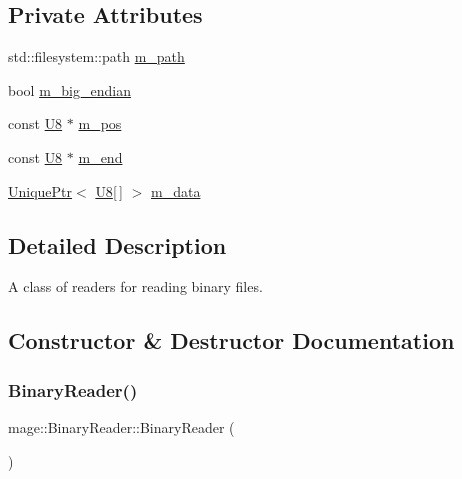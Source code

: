 \subsection*{Private Attributes}
\begin{DoxyCompactItemize}
\item 
std\+::filesystem\+::path \mbox{\hyperlink{classmage_1_1_binary_reader_a0941e624c8386fee2e2e92c6d1efdb75}{m\+\_\+path}}
\item 
bool \mbox{\hyperlink{classmage_1_1_binary_reader_a8d23fde958e08efe248edb5d92861113}{m\+\_\+big\+\_\+endian}}
\item 
const \mbox{\hyperlink{namespacemage_afc638980bc6154f15af5e2d93a0e0ea9}{U8}} $\ast$ \mbox{\hyperlink{classmage_1_1_binary_reader_aedb9632de1cf95d5af49499217744ed5}{m\+\_\+pos}}
\item 
const \mbox{\hyperlink{namespacemage_afc638980bc6154f15af5e2d93a0e0ea9}{U8}} $\ast$ \mbox{\hyperlink{classmage_1_1_binary_reader_a19b0f36cb1e8a05aaa9471514242e8ef}{m\+\_\+end}}
\item 
\mbox{\hyperlink{namespacemage_a3316d7143a973e37adf1110f2e80ca31}{Unique\+Ptr}}$<$ \mbox{\hyperlink{namespacemage_afc638980bc6154f15af5e2d93a0e0ea9}{U8}}\mbox{[}$\,$\mbox{]} $>$ \mbox{\hyperlink{classmage_1_1_binary_reader_a529bdcb620e1250aa0b12716c9b7eae1}{m\+\_\+data}}
\end{DoxyCompactItemize}


\subsection{Detailed Description}
A class of readers for reading binary files. 

\subsection{Constructor \& Destructor Documentation}
\mbox{\label{classmage_1_1_binary_reader_aab82579cef4f2f022273cf1adfcc8497}} 
\subsubsection{\texorpdfstring{Binary\+Reader()}{BinaryReader()}\hspace{0.1cm}{\footnotesize\ttfamily [1/3]}}
{\footnotesize\ttfamily mage\+::\+Binary\+Reader\+::\+Binary\+Reader (\begin{DoxyParamCaption}{ }\end{DoxyParamCaption})\hspace{0.3cm}{\ttfamily [protected]}}


